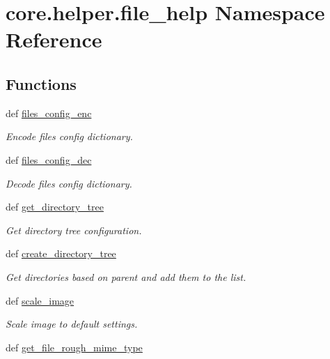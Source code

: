 \hypertarget{namespacecore_1_1helper_1_1file__help}{\section{core.\-helper.\-file\-\_\-help Namespace Reference}
\label{namespacecore_1_1helper_1_1file__help}
}
\subsection*{Functions}
\begin{DoxyCompactItemize}
\item 
def \hyperlink{namespacecore_1_1helper_1_1file__help_a90270300a353b999be66fcf3e8f7c9ec}{files\-\_\-config\-\_\-enc}
\begin{DoxyCompactList}\small\item\em Encode files config dictionary. \end{DoxyCompactList}\item 
def \hyperlink{namespacecore_1_1helper_1_1file__help_a05a957a1ecd3e14ca0f79975974c9578}{files\-\_\-config\-\_\-dec}
\begin{DoxyCompactList}\small\item\em Decode files config dictionary. \end{DoxyCompactList}\item 
def \hyperlink{namespacecore_1_1helper_1_1file__help_a7866c7bbb02e6413dc2f8d5d16ec6db9}{get\-\_\-directory\-\_\-tree}
\begin{DoxyCompactList}\small\item\em Get directory tree configuration. \end{DoxyCompactList}\item 
def \hyperlink{namespacecore_1_1helper_1_1file__help_afba9cd4cdbffaf28580418a77886bc31}{create\-\_\-directory\-\_\-tree}
\begin{DoxyCompactList}\small\item\em Get directories based on parent and add them to the list. \end{DoxyCompactList}\item 
def \hyperlink{namespacecore_1_1helper_1_1file__help_ac0c585b8343be422165fafc41b4acd8f}{scale\-\_\-image}
\begin{DoxyCompactList}\small\item\em Scale image to default settings. \end{DoxyCompactList}\item 
def \hyperlink{namespacecore_1_1helper_1_1file__help_aa12cfd2d1d8cc82e576b79a4be2bb75c}{get\-\_\-file\-\_\-rough\-\_\-mime\-\_\-type}

\end{DoxyCompactItemize}
